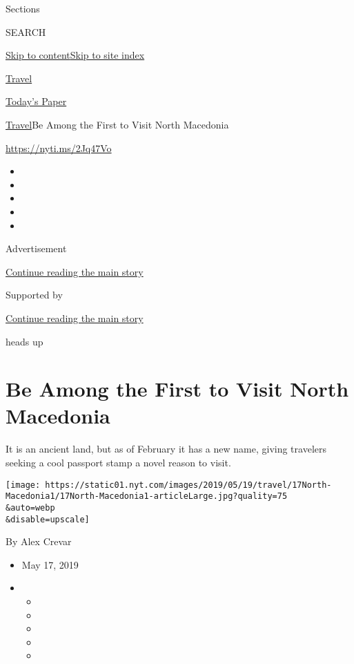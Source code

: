 Sections

SEARCH

\protect\hyperlink{site-content}{Skip to
content}\protect\hyperlink{site-index}{Skip to site index}

\href{https://www.nytimes.com/section/travel}{Travel}

\href{https://myaccount.nytimes.com/auth/login?response_type=cookie\&client_id=vi}{}

\href{https://www.nytimes.com/section/todayspaper}{Today's Paper}

\href{/section/travel}{Travel}\textbar{}Be Among the First to Visit
North Macedonia

\href{https://nyti.ms/2Jq47Vo}{https://nyti.ms/2Jq47Vo}

\begin{itemize}
\item
\item
\item
\item
\item
\end{itemize}

Advertisement

\protect\hyperlink{after-top}{Continue reading the main story}

Supported by

\protect\hyperlink{after-sponsor}{Continue reading the main story}

heads up

\hypertarget{be-among-the-first-to-visit-north-macedonia}{%
\section{Be Among the First to Visit North
Macedonia}\label{be-among-the-first-to-visit-north-macedonia}}

It is an ancient land, but as of February it has a new name, giving
travelers seeking a cool passport stamp a novel reason to visit.

\texttt{[image: https://static01.nyt.com/images/2019/05/19/travel/17North-Macedonia1/17North-Macedonia1-articleLarge.jpg?quality=75\\\&auto=webp\\\&disable=upscale]}

By Alex Crevar

\begin{itemize}
\item
  May 17, 2019
\item
  \begin{itemize}
  \item
  \item
  \item
  \item
  \item
  \end{itemize}
\end{itemize}

